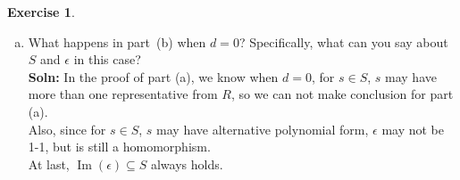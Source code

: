 \documentclass{amsart}
\newcommand{\im}{\operatorname{Im}}
\theoremstyle{plain}
\theoremstyle{definition}
\newtheorem{exer}[lem]{Exercise}
\begin{document}
\begin{exer}
\begin{enumerate}[(a)]
\begin{proof}
	Since $\im(\epsilon) \subseteq S$ and it is onto from $R$ to $S$, we have
	\[R \cong \im(\epsilon) \subseteq S. \]
\end{proof}
\item What happens in part~(b) when $d=0$? Specifically, what can you say about $S$ and $\epsilon$ in this case?\\
  \textbf{Soln:} In the proof of part (a), we know when $d = 0$, for $s \in S$, $s$ may have more than one representative from $R$, so we can not make conclusion for part (a).\\
Also, since for $s \in S$, $s$ may have alternative polynomial form, $\epsilon$ may not be 1-1, but is still a homomorphism.\\
At last, $\im(\epsilon) \subseteq S$ always holds.

\end{enumerate}
\end{exer}
\end{document}

